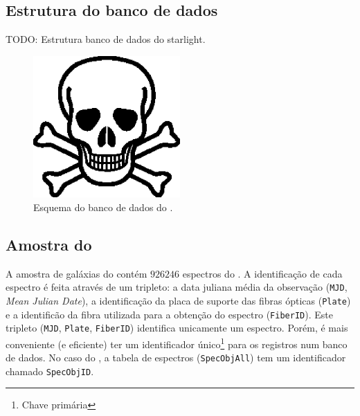 \subsection{Estrutura do banco de dados}
TODO: Estrutura banco de dados do starlight.

\begin{figure}
	\includegraphics[width=0.5\textwidth]{figuras/test.eps}
	\caption[Esquema do banco de dados do \starlight.]
	{Esquema do banco de dados do \starlight.}
	\label{fig:EsquemaBDStarlight}
\end{figure}

\subsection{Amostra do \starlight}
\label{sec:Crossmatch:AmostraStarlight}
A amostra de galáxias do \starlight contém $926246$ espectros do \SDSS. A
identificação de cada espectro é feita através de um tripleto: a data juliana
média da observação ({\tt MJD}, {\em Mean Julian Date}), a identificação da
placa de suporte das fibras ópticas ({\tt Plate}) e a identificão da fibra
utilizada para a obtenção do espectro ({\tt FiberID}). Este tripleto ({\tt MJD},
{\tt Plate}, {\tt FiberID}) identifica unicamente um espectro. Porém, é mais
conveniente (e eficiente) ter um identificador único{\footnote{Chave primária
\fixme}} para os registros num banco de dados. No caso do \SDSS, a tabela de
espectros ({\tt SpecObjAll}) tem um identificador chamado {\tt SpecObjID}.

